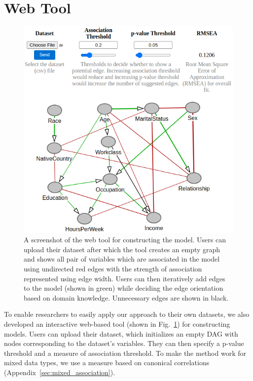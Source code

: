 \documentclass{uai2025} %
\begin{document}
\section{Web Tool}
\label{sec:web}

\begin{figure}[t!]
	\centering
	\includegraphics[scale=0.4]{../code/plots/web_tool_full_new.png}
	\caption{A screenshot of the web tool for constructing the model. Users
		can upload their dataset after which the tool creates an empty
		graph and shows all pair of variables which are associated in
		the model using undirected red edges with the strength of
		association represented using edge width. Users can then
		iteratively add edges to the model (shown in green) while
		deciding the edge orientation based on domain knowledge.
		Unnecessary edges are shown in black.}
	\label{fig:web}
\end{figure}

To enable researchers to easily apply our approach to their own datasets, we
also developed an interactive web-based tool (shown in Fig.~\ref{fig:web}) for
constructing models. Users can upload their dataset, which initializes an empty
DAG with nodes corresponding to the dataset's variables. They can then specify
a p-value threshold and a measure of association threshold. To make the method
work for mixed data types, we use a measure based on canonical correlations
(Appendix~\ref{sec:mixed_association}). 
\end{document}
